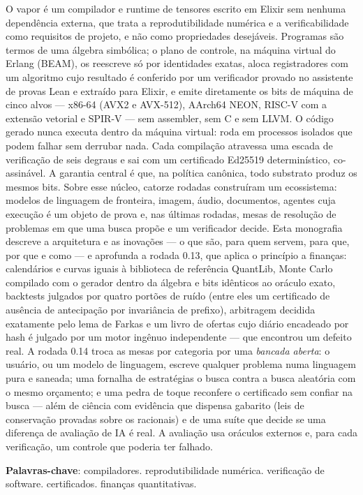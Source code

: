 \documentclass[
  12pt, openany, oneside, a4paper,
  chapter=TITLE, section=TITLE,
  english, brazil
]{abntex2}
\newcommand{\vapor}{\textsf{vapor}}
\begin{document}
\frenchspacing

\imprimircapa
\imprimirfolhaderosto

\begin{resumo}
O \vapor{} é um compilador e runtime de tensores escrito em Elixir sem nenhuma dependência externa, que trata a reprodutibilidade numérica e a verificabilidade como requisitos de projeto, e não como propriedades desejáveis. Programas são termos de uma álgebra simbólica; o plano de controle, na máquina virtual do Erlang (BEAM), os reescreve só por identidades exatas, aloca registradores com um algoritmo cujo resultado é conferido por um verificador provado no assistente de provas Lean e extraído para Elixir, e emite diretamente os bits de máquina de cinco alvos --- x86-64 (AVX2 e AVX-512), AArch64 NEON, RISC-V com a extensão vetorial e SPIR-V --- sem assembler, sem C e sem LLVM. O código gerado nunca executa dentro da máquina virtual: roda em processos isolados que podem falhar sem derrubar nada. Cada compilação atravessa uma escada de verificação de seis degraus e sai com um certificado Ed25519 determinístico, co-assinável. A garantia central é que, na política canônica, todo substrato produz os mesmos bits. Sobre esse núcleo, catorze rodadas construíram um ecossistema: modelos de linguagem de fronteira, imagem, áudio, documentos, agentes cuja execução é um objeto de prova e, nas últimas rodadas, mesas de resolução de problemas em que uma busca propõe e um verificador decide. Esta monografia descreve a arquitetura e as inovações --- o que são, para quem servem, para que, por que e como --- e aprofunda a rodada 0.13, que aplica o princípio a finanças: calendários e curvas iguais à biblioteca de referência QuantLib, Monte Carlo compilado com o gerador dentro da álgebra e bits idênticos ao oráculo exato, backtests julgados por quatro portões de ruído (entre eles um certificado de ausência de antecipação por invariância de prefixo), arbitragem decidida exatamente pelo lema de Farkas e um livro de ofertas cujo diário encadeado por hash é julgado por um motor ingênuo independente --- que encontrou um defeito real. A rodada 0.14 troca as mesas por categoria por uma \emph{bancada aberta}: o usuário, ou um modelo de linguagem, escreve qualquer problema numa linguagem pura e saneada; uma fornalha de estratégias o busca contra a busca aleatória com o mesmo orçamento; e uma pedra de toque reconfere o certificado sem confiar na busca --- além de ciência com evidência que dispensa gabarito (leis de conservação provadas sobre os racionais) e de uma suíte que decide se uma diferença de avaliação de IA é real. A avaliação usa oráculos externos e, para cada verificação, um controle que poderia ter falhado.

\textbf{Palavras-chave}: compiladores. reprodutibilidade numérica. verificação de software. certificados. finanças quantitativas.
\end{resumo}
\end{document}
